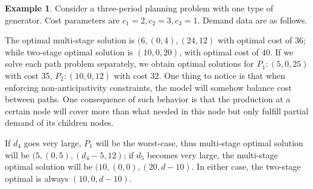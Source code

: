 \documentclass[10pt]{article}
\theoremstyle{plain}
\theoremstyle{definition}
\newtheorem{example}{Example}
\theoremstyle{remark}
\begin{document}
\begin{example}\label{ms-ts-diff1}
	Consider a three-period planning problem with one type of generator.
	Cost parameters are $c_1=2, c_2=3, c_3 =1$. Demand data are as follows.
	\begin{figure}[htb]
		\begin{center}
		\end{center}
	\end{figure}
	The optimal multi-stage solution is $(6,(0,4),(24,12)$ with optimal cost of $36$;
	while two-stage optimal solution is $(10,0,20)$, with optimal cost of $40$.
	If we solve each path problem separately, we obtain optimal solutions for
	$P_1: (5,0,25)$ with cost 35, $P_2: (10,0,12)$ with cost $32$.
	{\color{blue}
	One thing to notice is that when enforcing non-anticipativity constraints,
	the model will somehow balance cost between paths. One consequence of such behavior
	is that the production at a certain node will cover more than what needed in this node
	but only fulfill partial demand of its children nodes.}
	
	If $d_4$ goes very large, $P_1$ will be the worst-case, thus multi-stage optimal
	solution will be $(5,(0,5),(d_4-5, 12)$; if $d_5$ becomes very large, the multi-stage
	optimal solution will be $(10,(0,0),(20,d-10)$. In either case, the two-stage optimal
	is always $(10,0,d-10)$.
\end{example}
\end{document}
